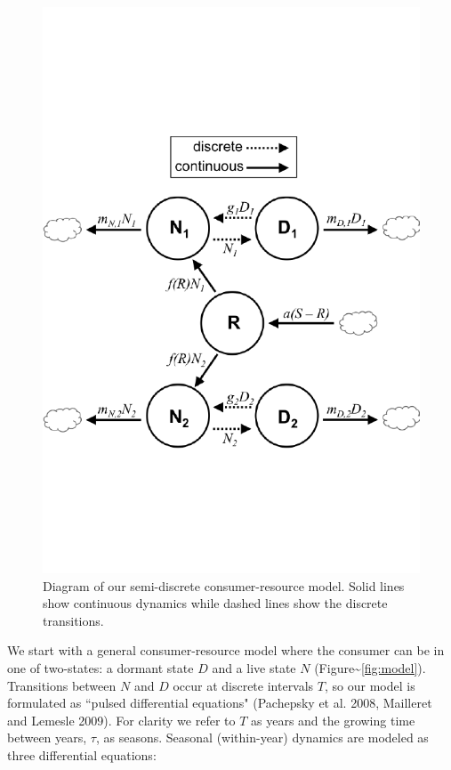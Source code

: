 \documentclass[12pt,]{article}
\begin{document}
\begin{figure}[htbp]
\centering
\includegraphics{components/figure/manuscript-figure_1.pdf}
\caption{Diagram of our semi-discrete consumer-resource model. Solid
lines show continuous dynamics while dashed lines show the discrete
transitions.}
\end{figure}

We start with a general consumer-resource model where the consumer can
be in one of two-states: a dormant state $D$ and a live state $N$
(Figure\textasciitilde{}\ref{fig:model}). Transitions between $N$ and
$D$ occur at discrete intervals $T$, so our model is formulated as
``pulsed differential equations" (Pachepsky et al. 2008, Mailleret and
Lemesle 2009). For clarity we refer to $T$ as years and the growing time
between years, $\tau$, as seasons. Seasonal (within-year) dynamics are
modeled as three differential equations:
\end{document}
